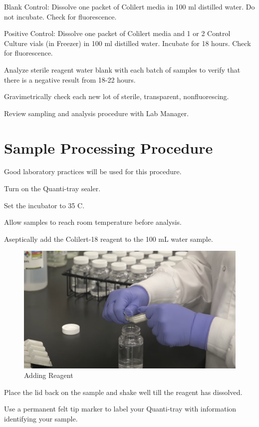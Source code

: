 \documentclass[12pt]{../SOP4_alpha}\usepackage[]{graphicx}\usepackage[]{xcolor}
\begin{document}
\NP Blank Control: Dissolve one packet of Colilert media in 100 ml distilled water. Do not incubate.
Check for fluorescence.

\NP Positive Control: Dissolve one packet of Colilert media and 1 or 2 Control Culture vials (in Freezer) in 100 ml distilled water. Incubate for 18 hours. Check for fluorescence.

\NP Analyze sterile reagent water blank with each batch of samples to
verify that there is a negative result from 18-22 hours.

\NP Gravimetrically check each new lot of sterile, transparent, nonfluorescing.

\NP Review sampling and analysis procedure with Lab Manager.

\section{Sample Processing Procedure}

Good laboratory practices will be used for this procedure.

\NP Turn on the Quanti-tray sealer. 

\NP Set the incubator to 35 \degree C.

\NP Allow samples to reach room temperature before analysis.

\NP Aseptically add the Colilert-18 reagent to the 100 mL water sample.

\begin{figure}[h]
\includegraphics[width=1.0\textwidth]{figures/AddingReagent.png}
\caption{Adding Reagent}
\label{fig:Adding Reagent}
\end{figure}

\NP Place the lid back on the sample and shake well till the reagent has dissolved.

\NP Use a permanent felt tip marker to label your Quanti-tray with information identifying your sample. 
\end{document}
